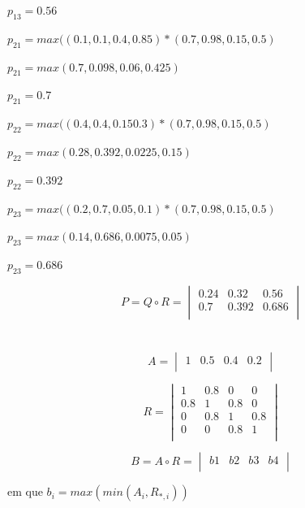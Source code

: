 \documentclass[conference]{IEEEtran}
\begin{document}
$p_{13} = 0.56$

\hspace{.5cm}

$p_{21} = max((0.1, 0.1, 0.4, 0.85) * (0.7, 0.98, 0.15, 0.5)$

$p_{21} = max(0.7, 0.098, 0.06, 0.425)$

$p_{21} = 0.7$

\hspace{.5cm}

$p_{22} = max((0.4, 0.4, 0.15 0.3) * (0.7, 0.98, 0.15, 0.5)$

$p_{22} = max(0.28, 0.392, 0.0225, 0.15)$

$p_{22} = 0.392$

\hspace{.5cm}

$p_{23} = max((0.2, 0.7, 0.05, 0.1) * (0.7, 0.98, 0.15, 0.5)$

$p_{23} = max(0.14, 0.686, 0.0075, 0.05)$

$p_{23} = 0.686$

\[
P = Q \circ R = 
\begin{vmatrix}
0.24 & 0.32 & 0.56 \\
0.7 & 0.392 & 0.686 \\
\end{vmatrix}
\]

\hfill
\section{}  %

\[
A = 
\begin{vmatrix}
1 & 0.5 & 0.4 & 0.2 \\
\end{vmatrix}
\]

\[
R = 
\begin{vmatrix}
1 & 0.8 & 0 & 0 \\
0.8 & 1 & 0.8 & 0 \\
0 & 0.8 & 1 & 0.8 \\
0 & 0 & 0.8 & 1 \\
\end{vmatrix}
\]

\hfill
\[
B = A \circ R = 
\begin{vmatrix}
b1 & b2 & b3 & b4 \\
\end{vmatrix}
\]

em que $b_{i} = max(min(A_{i}, R_{*, i}))$

\hspace{.5cm}
\end{document}
